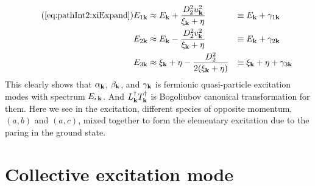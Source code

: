 \begin{align}\tag{\ref{eq:pathInt2:xiExpand}}
E_{1\vk}&\approx{}E_{\vk}+\frac{D_{2}^{2}u_{\vk}^{2}}{\xi_{\vk}+\eta}&\equiv{}&E_{\vk}+\gamma_{1\vk}\\
E_{2\vk}&\approx{}E_{\vk}-\frac{D_{2}^{2}v_{\vk}^{2}}{\xi_{\vk}+\eta}&\equiv{}&E_{\vk}+\gamma_{2\vk}
\label{eq:pathInt2:xiExpand2}\\
E_{3\vk}&\approx{}\xi_{\vk}+\eta-\frac{D_{2}^{2}}{2(\xi_{\vk}+\eta)}&\equiv{}&\xi_{\vk}+\eta+\gamma_{3\vk}
\label{eq:pathInt2:xiExpand3}
\end{align}
This clearly shows that $\alpha_{\mathbf{k}}$, $\beta_{\mathbf{k}}$, and $\gamma_{\mathbf{k}}$ is fermionic quasi-particle excitation modes with spectrum $E_{i\,\mathbf{k}}$.  And $L^{\dagger}_{\mathbf{k}}T^{\dagger}_{\mathbf{k}}$ is  Bogoliubov canonical transformation for them.  Here we see in the excitation, different species of opposite momentum, $(a,b)$ and $(a,c)$, mixed together to form the elementary excitation due to the paring in the ground state.  




\section{Collective excitation mode}
%

